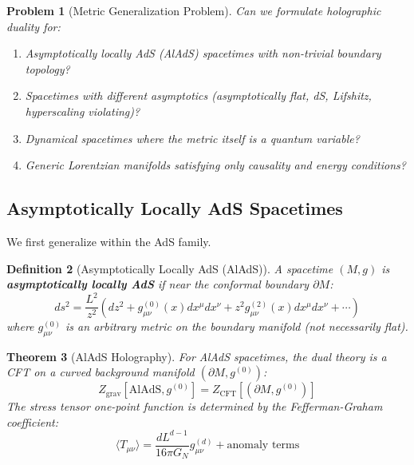 \documentclass[12pt,a4paper]{article}
\newtheorem{theorem}{Theorem}[section]
\newtheorem{definition}[theorem]{Definition}
\newtheorem{problem}[theorem]{Problem}
\begin{document}
\begin{problem}[Metric Generalization Problem]
Can we formulate holographic duality for:
\begin{enumerate}
    \item Asymptotically locally AdS (AlAdS) spacetimes with non-trivial boundary topology?
    \item Spacetimes with different asymptotics (asymptotically flat, dS, Lifshitz, hyperscaling violating)?
    \item Dynamical spacetimes where the metric itself is a quantum variable?
    \item Generic Lorentzian manifolds satisfying only causality and energy conditions?
\end{enumerate}
\end{problem}

\subsection{Asymptotically Locally AdS Spacetimes}

We first generalize within the AdS family.

\begin{definition}[Asymptotically Locally AdS (AlAdS)]
A spacetime $(M, g)$ is \textbf{asymptotically locally AdS} if near the conformal boundary $\partial M$:
\begin{equation}
ds^2 = \frac{L^2}{z^2}\left( dz^2 + g^{(0)}_{\mu\nu}(x) dx^\mu dx^\nu + z^2 g^{(2)}_{\mu\nu}(x) dx^\mu dx^\nu + \cdots \right)
\end{equation}
where $g^{(0)}_{\mu\nu}$ is an \textit{arbitrary} metric on the boundary manifold (not necessarily flat).
\end{definition}

\begin{theorem}[AlAdS Holography]
For AlAdS spacetimes, the dual theory is a CFT on a \textit{curved} background manifold $(\partial M, g^{(0)})$:
\begin{equation}
Z_{\text{grav}}[\text{AlAdS}, g^{(0)}] = Z_{\text{CFT}}[(\partial M, g^{(0)})]
\end{equation}
The stress tensor one-point function is determined by the Fefferman-Graham coefficient:
\begin{equation}
\langle T_{\mu\nu} \rangle = \frac{d L^{d-1}}{16\pi G_N} g^{(d)}_{\mu\nu} + \text{anomaly terms}
\end{equation}
\end{theorem}
\end{document}

